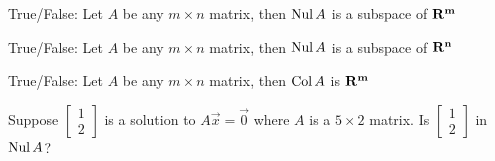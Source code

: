 \documentclass{ximera}
\newcommand{\RR}{\bf R}
\def\Nul{\mathop{\rm Nul}}
\def\Col{\mathop{\rm Col}}
\begin{document}
         \begin{question} True/False: Let $A$ be any $m\times n$ matrix, then $\Nul A$ is a subspace of $\RR^m$
         	
         	\begin{multipleChoice}
         	\end{multipleChoice}
         	
         \end{question}	
          \begin{question} True/False: Let $A$ be any $m\times n$ matrix, then $\Nul A$ is a subspace of $\RR^n$
          	
          	\begin{multipleChoice}
          		\choice[correct]{True}
          		\choice{False}
          	\end{multipleChoice}
          	
          \end{question}	
           \begin{question} True/False: Let $A$ be any $m\times n$ matrix, then $\Col A$ is $\RR^m$
           	
           	\begin{multipleChoice}
           	\end{multipleChoice}
           	
           \end{question}	
            \begin{question} Suppose $\begin{bmatrix} 1\\2\end{bmatrix}$ is a solution to $A\vec{x} = \vec{0}$ where $A$ is a $5\times 2$ matrix. Is $\begin{bmatrix} 1\\2\end{bmatrix}$ in $\Nul A$?
            	
            	\begin{multipleChoice}
            	\end{multipleChoice}
            	
            \end{question}	
\end{document}
